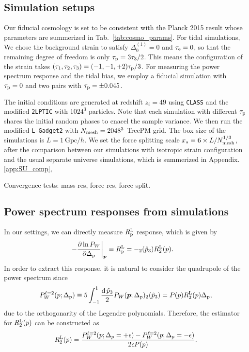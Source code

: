 \documentclass[a4paper,11pt]{article}
\let\L\relax
\DeclareMathOperator{\L}{\mathcal{L}}
\renewcommand{\d}{\mathrm{d}}
\newcommand{\vp}{{\bm p}}
\newcommand{\Lagrange}{\mathrm{L}}
\begin{document}
\subsection{Simulation setups}
Our fiducial cosmology is set to be consistent with the Planck 2015 result\cite{} whose parameters are summerized in Tab.~\ref{tab:cosmo_params}.
For tidal simulations, We chose the background strain to satisfy
$\Delta^{(1)}_0=0$ and $\tau_{\rm e}=0$, so that the remaining degree of freedom is only $\tau_{\rm p} = 3\tau_3/2$.
This means the configuration of the strain takes $(\tau_1, \tau_2, \tau_3) = ( -1, -1, +2 )\tau_{\rm p}/3 $.
For measuring the power spectrum response and the tidal bias, 
we employ a fiducial simulation with $\tau_{\rm p}=0$ and two pairs with $\tau_{\rm p} = \pm 0.045$. 

The initial conditions are generated at redshift $z_i=49$ using \texttt{CLASS} and the modified \texttt{2LPTIC} with $1024^3$ particles.
Note that each simulation with different $\tau_{\rm p}$ shares the initial random phases to cnacel the sample variance.
We then run the modified \texttt{L-Gadget2} with $N_{\rm mesh}=2048^3$ TreePM grid.
The box size of the simulations is $L = 1~ \mathrm{Gpc}/h$.
We set the force splitting scale $x_s=6 \times L/N^{1/3}_{\rm mesh}$,
after the comparison between our simulations with isotropic strain configuration and the usual separate universe simulations,
which is summerized in Appendix.\ref{app:SU_comp}, 


Convergence tests: mass res, force res, force split.

\subsection{Power spectrum responses from simulations}
In our settings, we can directly measure $R^{\rm L}_{\rm p}$ response, which is given by
\begin{align}
-\frac{\partial\ln P_W}{\partial\Delta_{\rm p}} \bigg|_\vp
    &\equiv R^{\rm L}_{\rm p}
    = - \L_2(\hat p_3) R^\Lagrange_2(p).
\end{align}
In order to extract this response, it is natural to consider the quadrupole of the power spectrum since
\begin{align}
P^{\ell=2}_W(p;\Delta_{\rm p}) \equiv 
5\int_{-1}^{1} \frac{\d\,\hat p_3}{2} P_W(\vp;\Delta_{\rm p}) \L_2(\hat p_3)
=P(p)R_2^{\rm L}(p)\Delta_{\rm p},
\end{align}
due to the orthogonarity of the Legendre polynomials.
Therefore, the estimator for $R_2^{\rm L}(p)$ can be constructed as 
\begin{align}
R_2^{\rm L}(p) = \frac{P_W^{\ell=2}(p;\Delta_p=+\epsilon) - P_W^{\ell=2}(p;\Delta_p=-\epsilon)}{2\epsilon P(p)}.
\end{align}
\end{document}
